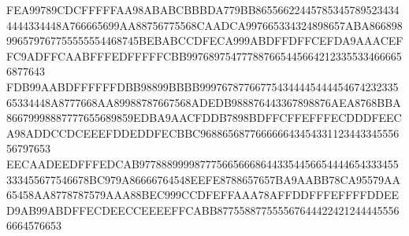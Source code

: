 FEA99789CDCFFFFFAA98ABABCBBBDA779BB865566224457853457895234344444334448A766665699AA88756775568CAADCA997665334324898657ABA866898996579767755555554468745BEBABCCDFECA999ABDFFDFFCEFDA9AAACEFFC9ADFFCAABFFFEDFFFFFCBB9976897547778876654456642123355334666656877643
FDB99AABDFFFFFFDBB98899BBBB99976787766775434444544445467423233565334448A8777668AA89988787667568ADEDB988876443367898876AEA8768BBA86679998887777655689859EDBA9AACFDDB7898BDFFCFFEFFFECDDDFEECA98ADDCCDCEEEFDDEDDFECBBC96886568776666664345433112344334555656797653
EECAADEEDFFFEDCAB97788899998777566566686443354456654444654333455333455677546678BC979A86666764548EEFE8788657657BA9AABB78CA95579AA65458AA8778787579AAA88BEC999CCDFEFFAAA78AFFDDFFFEFFFFDDEED9AB99ABDFFECDEECCEEEEFFCABB8775588775555676444224212444455566664576653